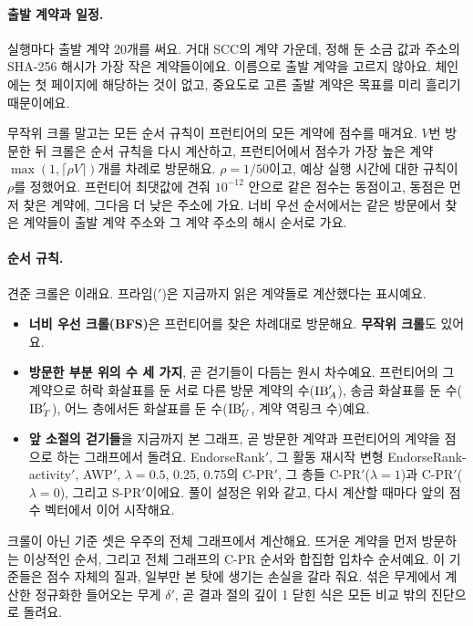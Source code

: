 \paragraph{출발 계약과 일정.}
실행마다 출발 계약 20개를 써요. 거대 SCC의 계약 가운데, 정해 둔 소금 값과 주소의 SHA-256 해시가 가장 작은 계약들이에요. 이름으로 출발 계약을 고르지 않아요. 체인에는 첫 페이지에 해당하는 것이 없고, 중요도로 고른 출발 계약은 목표를 미리 흘리기 때문이에요.

무작위 크롤 말고는 모든 순서 규칙이 프런티어의 모든 계약에 점수를 매겨요. $V$번 방문한 뒤 크롤은 순서 규칙을 다시 계산하고, 프런티어에서 점수가 가장 높은 계약 $\max(1,\lceil\rho V\rceil)$개를 차례로 방문해요. $\rho=1/50$이고, 예상 실행 시간에 대한 규칙이 $\rho$를 정했어요. 프런티어 최댓값에 견줘 $10^{-12}$ 안으로 같은 점수는 동점이고, 동점은 먼저 찾은 계약에, 그다음 더 낮은 주소에 가요. 너비 우선 순서에서는 같은 방문에서 찾은 계약들이 출발 계약 주소와 그 계약 주소의 해시 순서로 가요.

\paragraph{순서 규칙.}
견준 크롤은 이래요. 프라임($'$)은 지금까지 읽은 계약들로 계산했다는 표시예요.
\begin{itemize}
\item \textbf{너비 우선 크롤(BFS)}은 프런티어를 찾은 차례대로 방문해요. \textbf{무작위 크롤}도 있어요.
\item \textbf{방문한 부분 위의 수 세 가지}, 곧 걷기들이 다듬는 원시 차수예요. 프런티어의 그 계약으로 허락 화살표를 둔 서로 다른 방문 계약의 수($\mathrm{IB}'_A$), 송금 화살표를 둔 수($\mathrm{IB}'_T$), 어느 층에서든 화살표를 둔 수($\mathrm{IB}'_U$, 계약 역링크 수)예요.
\item \textbf{앞 소절의 걷기들}을 지금까지 본 그래프, 곧 방문한 계약과 프런티어의 계약을 점으로 하는 그래프에서 돌려요. EndorseRank$'$, 그 활동 재시작 변형 EndorseRank-activity$'$, AWP$'$, $\lambda=0.5$, 0.25, 0.75의 C-PR$'$, 그 층들 C-PR$'$($\lambda{=}1$)과 C-PR$'$($\lambda{=}0$), 그리고 S-PR$'$이에요. 풀이 설정은 위와 같고, 다시 계산할 때마다 앞의 점수 벡터에서 이어 시작해요.
\end{itemize}
크롤이 아닌 기준 셋은 우주의 전체 그래프에서 계산해요. 뜨거운 계약을 먼저 방문하는 이상적인 순서, 그리고 전체 그래프의 C-PR 순서와 합집합 입차수 순서예요. 이 기준들은 점수 자체의 질과, 일부만 본 탓에 생기는 손실을 갈라 줘요. 섞은 무게에서 계산한 정규화한 들어오는 무게 $\delta'$, 곧 결과 절의 깊이 1 닫힌 식은 모든 비교 밖의 진단으로 돌려요.

